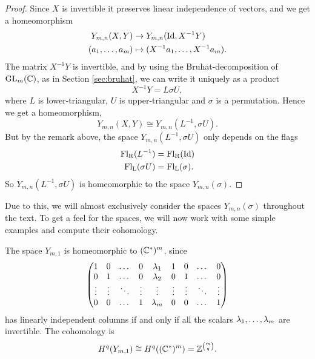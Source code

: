 \begin{proof}
  Since $X$ is invertible it preserves linear independence of vectors,
  and we get a homeomorphism
  \begin{align*}
    Y_{m,n}(X,Y) &\to Y_{m,n}(\operatorname{Id},X^{-1}Y) \\
    (a_1,\dots,a_m) &\mapsto (X^{-1}a_1,\dots,X^{-1}a_m).
  \end{align*}
  The matrix $X^{-1}Y$ is invertible, and by using the
  Bruhat-decomposition of $\operatorname{GL}_m(\mathbb{C})$, as in Section \ref{sec:bruhat},
  we can write it uniquely as a product 
  \[ X^{-1}Y = L\sigma U, \]
  where $L$ is lower-triangular, $U$ is upper-triangular and $\sigma$
  is a permutation. Hence we get a homeomorphism,
  \[ Y_{m,n}(X,Y) \cong Y_{m,n}(L^{-1}, \sigma U). \]
  But by the remark above, the space $Y_{m,n}(L^{-1},\sigma U)$ only
  depends
  on the flags 
  \begin{align*}
    \mathrm{Fl_R}(L^{-1}) &= \mathrm{Fl_R}(\operatorname{Id}) \\
    \mathrm{Fl_L}(\sigma U) &= \mathrm{Fl_L}(\sigma).
  \end{align*}
  So $Y_{m,n}(L^{-1},\sigma U)$ is homeomorphic to the space
  $Y_{m,n}(\sigma)$.
\end{proof}

Due to this, we will almost exclusively consider the spaces
$Y_{m,n}(\sigma)$ throughout the text. To get a feel for the spaces,
we will now work with some simple examples and compute their
cohomology.

\begin{example}
  \label{ex:n=1}

  The space $Y_{m,1}$ is homeomorphic to $(\mathbb{C}^*)^m$, since
  \[\begin{pmatrix}
    1&0&\dots&0&\lambda_1&1&0&\dots&0 \\
    0&1&\dots&0&\lambda_2&0&1&\dots&0 \\
    \vdots&\vdots&\ddots&\vdots&\vdots&\vdots&\vdots&\ddots&\vdots \\
    0&0&\dots&1&\lambda_m&0&0&\dots&1
  \end{pmatrix} \]
  has linearly independent columns if and only if all the scalars
  $\lambda_1,\dots,\lambda_m$ are invertible. The cohomology is
  \[ H^q(Y_{m,1}) \cong H^q((\mathbb{C}^*)^m) = \mathbb{Z}^{{m \choose q}}. \]
\end{example}

